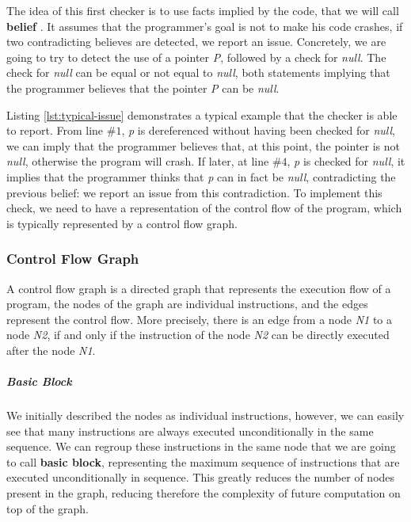 The idea of this first checker is to use facts implied by the code, that we will call \textbf{belief} \cite{Engler:2001:BDB:502059.502041}.
It assumes that the programmer’s goal is not to make his code crashes, if two contradicting believes are detected, we report an issue.
Concretely, we are going to try to detect the use of a pointer \emph{P}, followed by a check for \emph{null}. The check for \emph{null} can be equal or not equal to \emph{null}, both statements implying that the programmer believes that the pointer \emph{P} can be \emph{null}.



Listing \ref{lst:typical-issue} demonstrates a typical example that the checker is able to report. 
From line $\#1$, \emph{p} is dereferenced without having been checked for \emph{null}, we can imply that the programmer believes that, at this point, the pointer is not \emph{null}, otherwise the program will crash. 
If later, at line $\#4$, \emph{p} is checked for \emph{null}, it implies that the programmer thinks that \emph{p} can in fact be \emph{null}, contradicting the previous belief: we report an issue from this contradiction.
To implement this check, we need to have a representation of the control flow of the program, which is typically represented by a control flow graph.

\subsubsection{Control Flow Graph}
\label{subsubsec:control_flow_graph}

A control flow graph is a directed graph that represents the execution flow of a program, the nodes of the graph are individual instructions, and the edges represent the control flow. More precisely, there is an edge from a node \emph{N1} to a node \emph{N2}, if and only if the instruction of the node \emph{N2} can be directly executed after the node \emph{N1}.


\subparagraph{Basic Block}
We initially described the nodes as individual instructions, however, we can easily see that many instructions are always executed unconditionally in the same sequence.
We can regroup these instructions in the same node that we are going to call \textbf{basic block}, representing the maximum sequence of instructions that are executed unconditionally in sequence. 
This greatly reduces the number of nodes present in the graph, reducing therefore the complexity of future computation on top of the graph.

